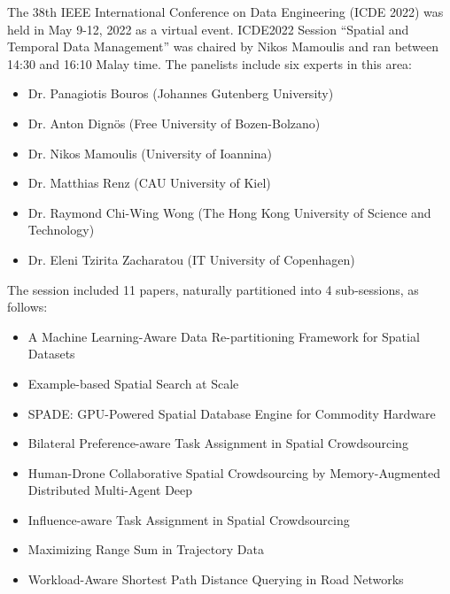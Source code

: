 \documentclass[11pt,dvipdfm]{article}
\begin{document}
The 38th IEEE International Conference on Data Engineering (ICDE 2022) was held in May 9-12, 2022 as a virtual event.  ICDE2022 Session ``Spatial and Temporal Data Management'' was chaired by Nikos Mamoulis and ran between 14:30 and 16:10 Malay time. The panelists include six experts in this area:

\begin{itemize}
    \item Dr. Panagiotis Bouros (Johannes Gutenberg University)
    \item Dr. Anton Dignös (Free University of Bozen-Bolzano)
    \item Dr. Nikos Mamoulis (University of Ioannina)
    \item Dr. Matthias Renz (CAU University of Kiel)
    \item Dr. Raymond Chi-Wing Wong (The Hong Kong University of Science and Technology)
    \item Dr. Eleni Tzirita Zacharatou (IT University of Copenhagen)
\end{itemize}

The session included 11 papers, naturally partitioned into 4 sub-sessions, as follows: 

\vspace{0.5cm}
\begin{itemize}
    \item A Machine Learning-Aware Data Re-partitioning Framework for Spatial Datasets
    \item Example-based Spatial Search at Scale
    \item SPADE: GPU-Powered Spatial Database Engine for Commodity Hardware
\end{itemize}

\begin{itemize}
\item
Bilateral Preference-aware Task Assignment in Spatial Crowdsourcing
\item
Human-Drone Collaborative Spatial Crowdsourcing by Memory-Augmented Distributed Multi-Agent Deep 
\item
Influence-aware Task Assignment in Spatial Crowdsourcing
\end{itemize}

\begin{itemize}
\item
Maximizing Range Sum in Trajectory Data
\item
Workload-Aware Shortest Path Distance Querying in Road Networks
\end{itemize}
\end{document}
